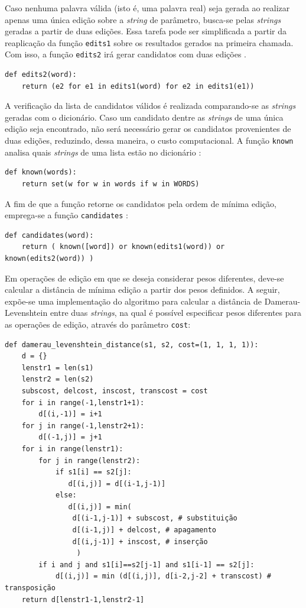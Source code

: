 \documentclass{textolivre}
\begin{document}
Caso nenhuma palavra válida (isto é,
uma palavra real) seja gerada ao
realizar
apenas uma única edição sobre a \textit{string} de parâmetro,
busca-se pelas \textit{strings} geradas a partir de duas edições. Essa tarefa
pode ser simplificada
a partir da reaplicação
da função \texttt{edits1} 
sobre os resultados gerados na
primeira chamada. Com isso, a função
\texttt{edits2} irá gerar candidatos com duas edições \parencite{norvig2007}.
\begin{lstlisting}[label=lst-list-edits2]
def edits2(word):
    return (e2 for e1 in edits1(word) for e2 in edits1(e1))
\end{lstlisting}%
 
A verificação da lista de candidatos válidos é realizada comparando-se as 
\textit{strings} geradas com o dicionário. Caso um candidato dentre as
\textit{strings} de uma única edição seja
encontrado, não será necessário gerar os candidatos provenientes de duas edições, reduzindo, dessa maneira,
o custo computacional.
A função \texttt{known} analisa quais
\textit{strings} de uma lista estão no dicionário \cite{norvig2007}:
\begin{lstlisting}[label=lst-known]
def known(words):
    return set(w for w in words if w in WORDS)
\end{lstlisting}%
A fim de que a função retorne os candidatos pela ordem de mínima edição,
emprega-se a função \texttt{candidates} \cite{norvig2007}:
\begin{lstlisting}[label=lst-candidates]
def candidates(word):
    return ( known([word]) or known(edits1(word)) or known(edits2(word)) )
\end{lstlisting}%

Em operações de edição em que se deseja considerar pesos diferentes, deve-se
calcular a distância de mínima edição a partir dos pesos definidos.
A seguir, expõe-se uma implementação do 
algoritmo para calcular a distância de Damerau-Levenshtein \cite{jurafsky2008} entre duas \textit{strings},
na qual é possível especificar pesos diferentes para as operações de edição, através do parâmetro \texttt{cost}:
\begin{lstlisting}[label=lst-edit-dist]
def damerau_levenshtein_distance(s1, s2, cost=(1, 1, 1, 1)):
    d = {}
    lenstr1 = len(s1)
    lenstr2 = len(s2)
    subscost, delcost, inscost, transcost = cost
    for i in range(-1,lenstr1+1):
        d[(i,-1)] = i+1
    for j in range(-1,lenstr2+1):
        d[(-1,j)] = j+1
    for i in range(lenstr1):
        for j in range(lenstr2):
            if s1[i] == s2[j]:
               d[(i,j)] = d[(i-1,j-1)]
            else:
               d[(i,j)] = min(
				d[(i-1,j-1)] + subscost, # substituição
				d[(i-1,j)] + delcost, # apagamento
				d[(i,j-1)] + inscost, # inserção
			     )
	    if i and j and s1[i]==s2[j-1] and s1[i-1] == s2[j]:
 	        d[(i,j)] = min (d[(i,j)], d[i-2,j-2] + transcost) # transposição
    return d[lenstr1-1,lenstr2-1] 
\end{lstlisting}%
\end{document}
